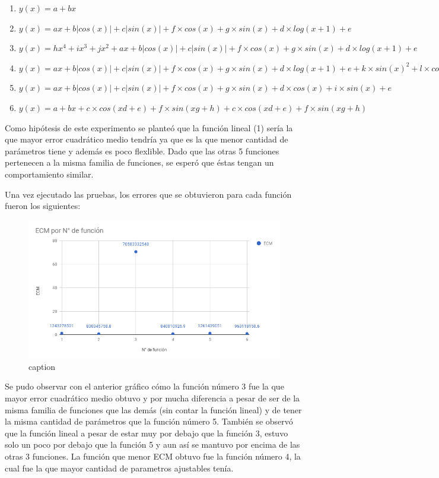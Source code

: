 \begin{enumerate}
  \item $y(x) = a + bx$
  \item $y(x) = ax + b|cos(x)| + c|sin(x)| + f  \times  cos(x) + g  \times  sin(x) + d  \times  log(x+1) + e$
  \item $y(x) = hx^4 + ix^3 + jx^2 + ax + b|cos(x)| + c|sin(x)| + f  \times  cos(x) + g  \times  sin(x) + d  \times  log(x+1) + e$
  \item $y(x) = ax + b|cos(x)| + c|sin(x)| + f  \times  cos(x) + g  \times  sin(x) + d  \times  log(x+1) + e + k  \times  sin(x) ^ 2 + l  \times  cos(x) ^ 2$
  \item $y(x) = ax + b|cos(x)| + c|sin(x)| + f  \times  cos(x) + g  \times  sin(x) + d  \times  cos(x) + i  \times  sin(x)  + e$
  \item $y(x) = a + bx + c  \times  cos(xd + e) + f  \times  sin(xg + h) + c  \times  cos(xd + e) + f  \times  sin(xg + h)$
\end{enumerate}


Como hipótesis de este experimento se planteó que la función lineal (1) sería la que mayor error cuadrático medio tendría ya que es la que menor cantidad de parámetros tiene y además es poco flexlible. Dado que las otras 5 funciones pertenecen a la misma familia de funciones, se esperó que éstas tengan un comportamiento similar.

Una vez ejecutado las pruebas, los errores que se obtuvieron para cada función fueron los siguientes:

\begin{figure}[!htb]
\begin{center}
\includegraphics[scale=0.5]{imagenes/ecm_por_fn.png}
\caption{caption}
\label{vuelos-3}
\end{center}
\end{figure}

Se pudo observar con el anterior gráfico cómo la función número 3 fue la que mayor error cuadrático medio obtuvo y por mucha diferencia a pesar de ser de la misma familia de funciones que las demás (sin contar la función lineal) y de tener la misma cantidad de parámetros que la función número 5. También se observó que la función lineal a pesar de estar muy por debajo que la función 3, estuvo solo un poco por debajo que la función 5 y aun así se mantuvo por encima de las otras 3 funciones.
La función que menor ECM obtuvo fue la función número 4, la cual fue la que mayor cantidad de parametros ajustables tenía.
